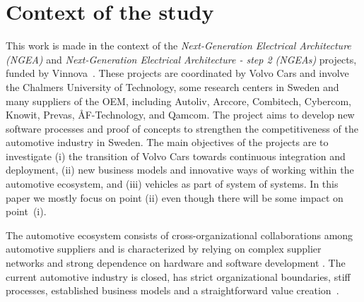\section{Context of the study}\label{sec:context}


This work is made in the context of the {\em Next-Generation Electrical Architecture (NGEA)} and {\em Next-Generation Electrical Architecture - step 2 (NGEAs)} projects, funded by Vinnova~\cite{Vinnova}. 
These projects are coordinated by Volvo Cars and involve the Chalmers University of Technology, some research centers in Sweden and many suppliers of the OEM, including Autoliv, Arccore, Combitech, Cybercom, Knowit, Prevas, \AA F-Technology, and Qamcom. The project aims to develop new software processes and proof of concepts to strengthen the competitiveness of the automotive industry in Sweden. The main objectives of the projects are to investigate (i) the transition of Volvo Cars towards continuous integration and deployment, (ii) new business models and innovative ways of working within the automotive ecosystem, and (iii) vehicles as part of system of systems. 
In this paper we mostly focus on point (ii) even though there will be some impact on point~(i).

The automotive ecosystem consists of cross-organizational collaborations among automotive suppliers and is characterized by relying on complex supplier networks and strong dependence on hardware and software development \cite{Patrizio2016AAF_Chalmers,Knauss14d.:towards,Broy:2006:CAS:1134285.1134292}.
The current automotive industry is closed, has strict organizational boundaries, stiff processes, established business models and a straightforward value creation~\cite{ConnectedVehicle2012}.


